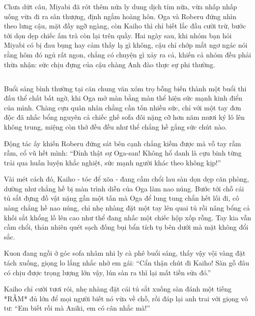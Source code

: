 \documentclass[../main.tex]{subfiles}
\begin{document}
Chưa dứt câu, Miyabi đã rót thêm nửa ly dung dịch tím nữa, vừa nhấp nhấp uống vừa đi ra sân thượng, định ngắm hoàng hôn. Oga và Roberu đứng nhìn theo lưng cậu, mặt đầy ngỡ ngàng, còn Kaiho thì chỉ biết lắc đầu cười trừ, bước tới dọn dẹp chiếc ấm trà còn lại trên quầy. Hai ngày sau, khi nhóm bạn hỏi Miyabi có bị đau bụng hay cảm thấy lạ gì không, cậu chỉ chớp mắt ngơ ngác nói rằng hôm đó ngủ rất ngon, chẳng có chuyện gì xảy ra cả, khiến cả nhóm đều phải thừa nhận: sức chịu đựng của cậu chàng Anh đào thực sự phi thường.

\newpage

\subsection*{\label{ep-M8.VII}}
\vspace{-4pt}

Buổi sáng bình thường tại căn chung văn xóm trọ bỗng biến thành một buổi thi đấu thể chất bất ngờ, khi Oga mở màn bằng màn thể hiện sức mạnh kinh điển của mình. Chàng cựu quân nhân chẳng cần tốn nhiều sức, chỉ với một tay đơn độc đã nhấc bổng nguyên cả chiếc ghế sofa đôi nặng cỡ hơn năm mươi ký lô lên không trung, miệng còn thở đều đều như thể chẳng hề gắng sức chút nào.

Động tác ấy khiến Roberu đứng sát bên cạnh chẳng kiềm được mà vỗ tay rầm rầm, cổ vũ hết mình: ``Đỉnh thật sự Oga-san! Không hổ danh là cựu binh từng trải qua huấn luyện khắc nghiệt, sức mạnh người khác theo không kịp!''

Vài mét cách đó, Kaiho - tóc để xõa - đang cầm chổi lau sàn dọn dẹp căn phòng, dường như chẳng hề bị màn trình diễn của Oga làm nao núng. Bước tới chỗ cái tủ sắt đựng đồ vật nặng gần một tấn mà Oga để lung tung chắn hết lối đi, cô nàng chẳng hề nao núng, chỉ nhẹ nhàng đặt một tay lên quai tủ rồi nâng bổng cả khối sắt khổng lồ lên cao như thể đang nhấc một chiếc hộp xốp rỗng. Tay kia vẫn cầm chổi, thản nhiên quét sạch đống bụi bẩn tích tụ bên dưới mà mặt không đổi sắc.

Kuon đang ngồi ở góc sofa nhâm nhi ly cà phê buổi sáng, thấy vậy vội vàng đặt tách xuống, giọng lo lắng nhắc nhở em gái: ``Cẩn thận chút đi Kaiho! Sàn gỗ đâu có chịu được trọng lượng lớn vậy, lún sàn ra thì lại mất tiền sửa đó.''

Kaiho chỉ cười tươi rói, nhẹ nhàng đặt cái tủ sắt xuống sàn đánh một tiếng *RẦM* đủ lớn để mọi người biết nó vừa về chỗ, rồi đáp lại anh trai với giọng vô tư: ``Em biết rồi mà Aniki, em có cân nhắc mà!''
\end{document}
